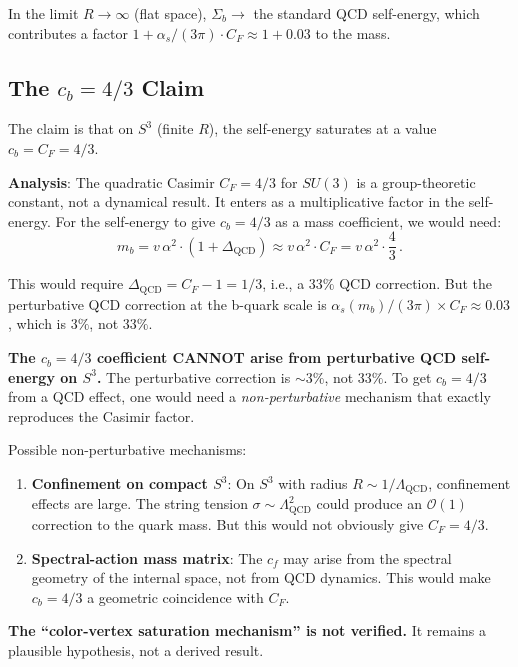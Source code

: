 \documentclass[11pt,a4paper]{article}
\begin{document}
In the limit $R \to \infty$ (flat space), $\Sigma_b \to$ the standard QCD self-energy, which contributes a factor $1 + \alpha_s/(3\pi) \cdot C_F \approx 1 + 0.03$ to the mass.

\subsection{The $c_b = 4/3$ Claim}

The claim is that on $S^3$ (finite $R$), the self-energy saturates at a value $c_b = C_F = 4/3$.

\textbf{Analysis}: The quadratic Casimir $C_F = 4/3$ for $SU(3)$ is a group-theoretic constant, not a dynamical result. It enters as a multiplicative factor in the self-energy. For the self-energy to give $c_b = 4/3$ as a mass coefficient, we would need:
\begin{equation}
m_b = v\,\alpha^2 \cdot (1 + \Delta_{\mathrm{QCD}}) \approx v\,\alpha^2 \cdot C_F = v\,\alpha^2 \cdot \frac{4}{3}\,.
\end{equation}

This would require $\Delta_{\mathrm{QCD}} = C_F - 1 = 1/3$, i.e., a $33\%$ QCD correction. But the perturbative QCD correction at the b-quark scale is $\alpha_s(m_b)/(3\pi) \times C_F \approx 0.03$, which is $3\%$, not $33\%$.

\begin{tcolorbox}[colback=red!5!white, colframe=red!60!black, title={Agent 11 Critical Finding}]
\textbf{The $c_b = 4/3$ coefficient CANNOT arise from perturbative QCD self-energy on $S^3$.} The perturbative correction is $\sim 3\%$, not $33\%$. To get $c_b = 4/3$ from a QCD effect, one would need a \emph{non-perturbative} mechanism that exactly reproduces the Casimir factor.

Possible non-perturbative mechanisms:
\begin{enumerate}
\item \textbf{Confinement on compact $S^3$}: On $S^3$ with radius $R \sim 1/\Lambda_{\mathrm{QCD}}$, confinement effects are large. The string tension $\sigma \sim \Lambda_{\mathrm{QCD}}^2$ could produce an $\mathcal{O}(1)$ correction to the quark mass. But this would not obviously give $C_F = 4/3$.
\item \textbf{Spectral-action mass matrix}: The $c_f$ may arise from the spectral geometry of the internal space, not from QCD dynamics. This would make $c_b = 4/3$ a geometric coincidence with $C_F$.
\end{enumerate}

\textbf{The ``color-vertex saturation mechanism'' is not verified.} It remains a plausible hypothesis, not a derived result.
\end{tcolorbox}
\end{document}
